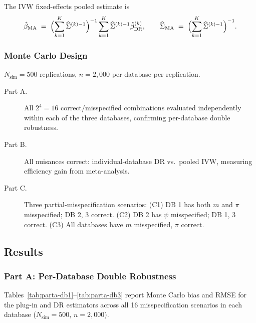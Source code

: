 The IVW fixed-effects pooled estimate is
\begin{align}
  \hat\beta_{\mathrm{MA}}
  \;=\; \Bigl(\sum_{k=1}^K \widehat{\Sigma}^{(k)-1}\Bigr)^{-1}
    \sum_{k=1}^K \widehat{\Sigma}^{(k)-1} \hat\beta^{(k)}_{\mathrm{DR}},
  \qquad
  \widehat{\Sigma}_{\mathrm{MA}}
  \;=\; \Bigl(\sum_{k=1}^K \widehat{\Sigma}^{(k)-1}\Bigr)^{-1}.
\end{align}

\subsubsection*{Monte Carlo Design}

$N_{\mathrm{sim}} = 500$ replications, $n = 2{,}000$ per database per
replication.

\begin{description}
  \item[Part A.] All $2^4 = 16$ correct/misspecified combinations evaluated
    independently within each of the three databases,
    confirming per-database double robustness.
  \item[Part B.] All nuisances correct: individual-database DR vs.\ pooled IVW,
    measuring efficiency gain from meta-analysis.
  \item[Part C.] Three partial-misspecification scenarios:
    (C1) DB 1 has both $m$ and $\pi$ misspecified; DB 2, 3 correct.
    (C2) DB 2 has $\psi$ misspecified; DB 1, 3 correct.
    (C3) All databases have $m$ misspecified, $\pi$ correct.
\end{description}

\subsection*{Results}

\subsubsection*{Part A: Per-Database Double Robustness}

Tables~\ref{tab:parta-db1}--\ref{tab:parta-db3} report Monte Carlo bias
and RMSE for the plug-in and DR estimators across all 16 misspecification
scenarios in each database ($N_{\mathrm{sim}} = 500$, $n = 2{,}000$).

